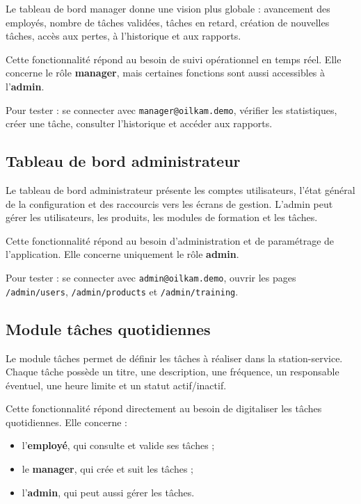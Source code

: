 \documentclass[11pt,a4paper]{article}
\newcommand{\role}[1]{\textbf{\color{oilgreen}#1}}
\newcommand{\code}[1]{\texttt{#1}}
\begin{document}
Le tableau de bord manager donne une vision plus globale : avancement des employés, nombre de tâches validées, tâches en retard, création de nouvelles tâches, accès aux pertes, à l'historique et aux rapports.

Cette fonctionnalité répond au besoin de suivi opérationnel en temps réel. Elle concerne le rôle \role{manager}, mais certaines fonctions sont aussi accessibles à l'\role{admin}.

Pour tester : se connecter avec \code{manager@oilkam.demo}, vérifier les statistiques, créer une tâche, consulter l'historique et accéder aux rapports.

\subsection{Tableau de bord administrateur}

Le tableau de bord administrateur présente les comptes utilisateurs, l'état général de la configuration et des raccourcis vers les écrans de gestion. L'admin peut gérer les utilisateurs, les produits, les modules de formation et les tâches.

Cette fonctionnalité répond au besoin d'administration et de paramétrage de l'application. Elle concerne uniquement le rôle \role{admin}.

Pour tester : se connecter avec \code{admin@oilkam.demo}, ouvrir les pages \code{/admin/users}, \code{/admin/products} et \code{/admin/training}.

\subsection{Module tâches quotidiennes}

Le module tâches permet de définir les tâches à réaliser dans la station-service. Chaque tâche possède un titre, une description, une fréquence, un responsable éventuel, une heure limite et un statut actif/inactif.

Cette fonctionnalité répond directement au besoin de digitaliser les tâches quotidiennes. Elle concerne :

\begin{itemize}
  \item l'\role{employé}, qui consulte et valide ses tâches ;
  \item le \role{manager}, qui crée et suit les tâches ;
  \item l'\role{admin}, qui peut aussi gérer les tâches.
\end{itemize}
\end{document}
